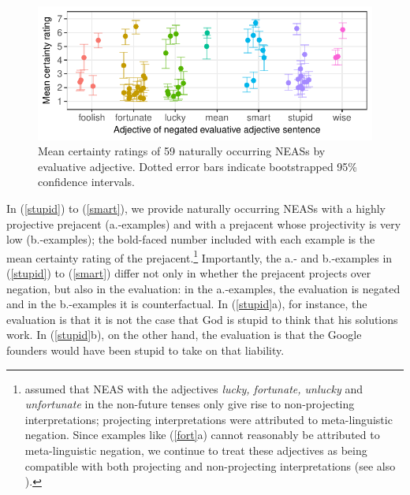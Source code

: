 \documentclass[11pt,fleqn]{article}
\newcommand{\6}{\mbox{$[\hspace*{-.6mm}[$}}
\newcommand{\9}{\mbox{$]\hspace*{-.6mm}]$}}
\begin{document}
\begin{figure}[h!]
\centering

\includegraphics[width=.7\paperwidth]{../exp1-corpus-study/graphs/mean-response-by-item-and-adj}

\caption{Mean certainty ratings of 59 naturally occurring NEASs by evaluative adjective. Dotted error bars indicate bootstrapped 95\% confidence intervals.}\label{f-corpus}

\end{figure}

In (\ref{stupid}) to (\ref{smart}), we provide naturally occurring NEASs with a highly projective prejacent (a.-examples) and with a prejacent whose projectivity is very low (b.-examples); the bold-faced number included
with each example is the mean certainty rating of the prejacent.\footnote{\citet{karttunen2013}
assumed that NEAS with the  adjectives {\em
lucky, fortunate, unlucky} and {\em unfortunate} in the non-future
tenses only give rise to non-projecting interpretations; projecting
interpretations were attributed to meta-linguistic negation. Since
examples like (\ref{fort}a) cannot reasonably be attributed to
meta-linguistic negation, we continue to treat these adjectives as being compatible with 
both projecting and non-projecting interpretations (see also \citealt{karttunen-etal2014}).} Importantly, the a.- and b.-examples in (\ref{stupid}) to (\ref{smart}) differ not only in whether the prejacent projects over negation, but also in the evaluation: in the a.-examples, the evaluation is negated and in the b.-examples it is counterfactual. In (\ref{stupid}a), for instance, the evaluation is that it is not the case that God is stupid to think that his solutions work. In (\ref{stupid}b), on the other hand, the evaluation is that the Google founders would have been stupid to take on that liability.
 


\end{document}
